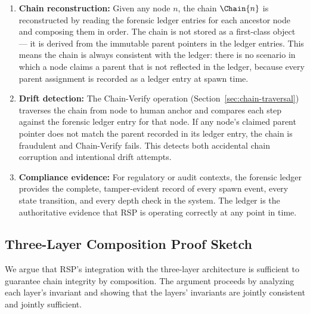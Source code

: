 \begin{enumerate}
\item \textbf{Chain reconstruction:} Given any node $n$, the chain $\Chain{n}$ is reconstructed by reading the forensic ledger entries for each ancestor node and composing them in order. The chain is not stored as a first-class object — it is derived from the immutable parent pointers in the ledger entries. This means the chain is always consistent with the ledger: there is no scenario in which a node claims a parent that is not reflected in the ledger, because every parent assignment is recorded as a ledger entry at spawn time.

\item \textbf{Drift detection:} The Chain-Verify operation (Section~\ref{sec:chain-traversal}) traverses the chain from node to human anchor and compares each step against the forensic ledger entry for that node. If any node's claimed parent pointer does not match the parent recorded in its ledger entry, the chain is fraudulent and Chain-Verify fails. This detects both accidental chain corruption and intentional drift attempts.

\item \textbf{Compliance evidence:} For regulatory or audit contexts, the forensic ledger provides the complete, tamper-evident record of every spawn event, every state transition, and every depth check in the system. The ledger is the authoritative evidence that RSP is operating correctly at any point in time.
\end{enumerate}

\subsection{Three-Layer Composition Proof Sketch}
\label{sec:three-layer-composition}

We argue that RSP's integration with the three-layer architecture is sufficient to guarantee chain integrity by composition. The argument proceeds by analyzing each layer's invariant and showing that the layers' invariants are jointly consistent and jointly sufficient.

